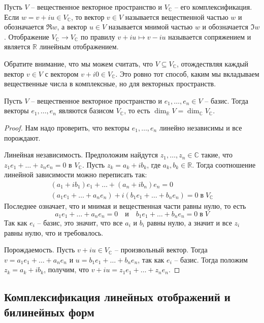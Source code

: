 \begin{definition}
Пусть $V$ -- вещественное векторное пространство и $V_\mathbb C$ -- его комплексификация.
Если $w = v +i u\in V_\mathbb C$, то вектор $v\in V$ называется вещественной частью $w$ и обозначается $\Re w$, а вектор $u\in V$ называется мнимой частью $w$ и обозначается $\Im w$.
Отображение $V_\mathbb C\to V_\mathbb C$ по правилу $v+iu\mapsto v-iu$ называется сопряжением и является $\mathbb R$ линейным отображением.
\end{definition}

Обратите внимание, что мы можем считать, что $V\subseteq V_\mathbb C$, отождествляя каждый вектор $v\in V$ с вектором $v+i0\in V_\mathbb C$.
Это ровно тот способ, каким мы вкладываем вещественные числа в комплексные, но для векторных пространств.

\begin{claim}
\label{claim::ComplfixBasis}
Пусть $V$ -- вещественное векторное пространство и $e_1,\ldots,e_n\in V$ -- базис.
Тогда векторы $e_1,\ldots,e_n$ являются базисом $V_\mathbb C$, то есть $\dim_\mathbb R V = \dim_\mathbb C V_\mathbb C$.
\end{claim}
\begin{proof}
Нам надо проверить, что векторы $e_1,\ldots,e_n$ линейно независимы и все порождают.

Линейная независимость.
Предположим найдутся $z_1,\ldots,z_n\in \mathbb C$ такие, что $z_1 e_1+ \ldots+ z_n e_n = 0$ в $V_\mathbb C$.
Пусть $z_k = a_k + i b_k$, где $a_k,b_k \in \mathbb R$.
Тогда соотношение линейной зависимости можно переписать так:
\begin{gather*}
(a_1+ib_1)e_1 + \ldots + (a_n + i b_n)e_n = 0\\
(a_1 e_1 + \ldots + a_n e_n) + i(b_1 e_1 + \ldots + b_n e_n) = 0\;\text{в}\; V_\mathbb C
\end{gather*}
Последнее означает, что и мнимая и вещественная части равны нулю, то есть
\[
a_1 e_1 + \ldots + a_n e_n = 0\quad \text{и}\quad b_1 e_1 + \ldots + b_n e_n = 0\;\text{в}\; V
\]
Так как $e_i$ -- базис, это значит, что все $a_i$ и $b_i$ равны нулю, а значит и все $z_i$ равны нулю, что и требовалось.

Порождаемость.
Пусть $v + i u\in V_\mathbb C$ -- произвольный вектор.
Тогда $v = a_1e_1+\ldots + a_n e_n$ и $u = b_1 e_1 + \ldots + b_n e_n$, так как $e_i$ -- базис.
Тогда положим $z_k = a_k + i b_k$, получим, что $v + iu = z_1 e_1 + \ldots + z_n e_n$.
\end{proof}

\subsection{Комплексификация линейных отображений и билинейных форм}
\label{subsection::complexification}

